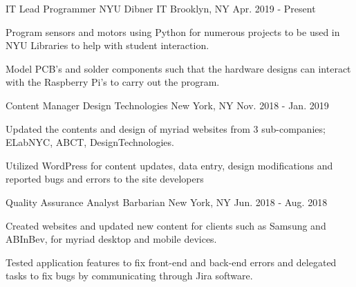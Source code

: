 
\begin{cventries}

  \cventry
    {IT Lead Programmer} %
    {NYU Dibner IT} %
    {Brooklyn, NY} %
    {Apr. 2019 - Present} %
    {
      \begin{cvitems} %
        \item {Program sensors and motors using Python for numerous projects to be used in NYU Libraries to help with student interaction. }
        \item {Model PCB's and solder components such that the hardware designs can interact with the Raspberry Pi’s to carry out the program.}
      \end{cvitems}
    }

  \cventry
    {Content Manager} %
    {Design Technologies} %
    {New York, NY} %
    {Nov. 2018 - Jan. 2019} %
    {
      \begin{cvitems} %
        \item {Updated the contents and design of myriad websites from 3 sub-companies; ELabNYC, ABCT, DesignTechnologies.}
		\item {Utilized WordPress for content updates, data entry, design modifications and reported bugs and errors to the site developers}
      \end{cvitems}
    }

  \cventry
    {Quality Assurance Analyst} %
    {Barbarian} %
    {New York, NY} %
    {Jun. 2018 - Aug. 2018} %
    {
      \begin{cvitems} %
        \item {Created websites and updated new content for clients such as Samsung and ABInBev, for myriad desktop and mobile devices.}
		\item {Tested application features to fix front-end and back-end errors and delegated tasks to fix bugs by communicating through Jira software.}
      \end{cvitems}
    }

\end{cventries}